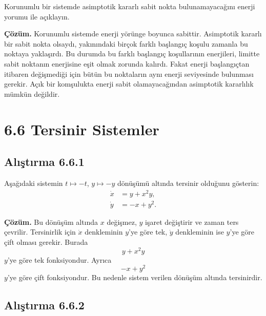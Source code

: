 \begin{justify}
Korunumlu bir sistemde asimptotik kararlı sabit nokta bulunamayacağını enerji yorumu ile açıklayın.

\textbf{Çözüm.} Korunumlu sistemde enerji yörünge boyunca sabittir. Asimptotik kararlı bir sabit nokta olsaydı, yakınındaki birçok farklı başlangıç koşulu zamanla bu noktaya yaklaşırdı. Bu durumda bu farklı başlangıç koşullarının enerjileri, limitte sabit noktanın enerjisine eşit olmak zorunda kalırdı. Fakat enerji başlangıçtan itibaren değişmediği için bütün bu noktaların aynı enerji seviyesinde bulunması gerekir. Açık bir komşulukta enerji sabit olamayacağından asimptotik kararlılık mümkün değildir.
\end{justify}

\section*{6.6 Tersinir Sistemler}

\subsection*{Alıştırma 6.6.1}

\begin{justify}
Aşağıdaki sistemin $t\mapsto -t$, $y\mapsto -y$ dönüşümü altında tersinir olduğunu gösterin:
\begin{align}
\dot{x} &= y+x^2y,\\
\dot{y} &= -x+y^2.
\end{align}

\textbf{Çözüm.} Bu dönüşüm altında $x$ değişmez, $y$ işaret değiştirir ve zaman ters çevrilir. Tersinirlik için $\dot{x}$ denkleminin $y$'ye göre tek, $\dot{y}$ denkleminin ise $y$'ye göre çift olması gerekir. Burada
\begin{equation}
y+x^2y
\end{equation}
$y$'ye göre tek fonksiyondur. Ayrıca
\begin{equation}
-x+y^2
\end{equation}
$y$'ye göre çift fonksiyondur. Bu nedenle sistem verilen dönüşüm altında tersinirdir.
\end{justify}

\subsection*{Alıştırma 6.6.2}


